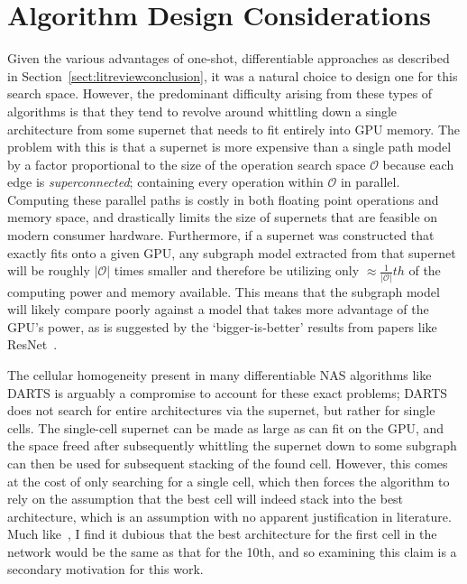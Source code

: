 \section{Algorithm Design Considerations} \label{sect:alg design considerations}
Given the various advantages of one-shot, differentiable approaches as described in Section~\ref{sect:litreviewconclusion}, it was a natural choice to design one for this search space.
However, the predominant difficulty arising from these types of algorithms is that they tend to revolve around whittling down
a single architecture from some supernet that needs to fit entirely into GPU memory. The problem
with this is that a supernet is more expensive than a single path model by a factor proportional to the size of the
operation search space $\mathcal{O}$ because each edge is \textit{superconnected}; containing every operation within
$\mathcal{O}$ in parallel. Computing these parallel paths is costly in both floating point operations and memory
space, and drastically limits the size of supernets that are feasible on modern consumer hardware. Furthermore,
if a supernet was constructed that exactly fits onto a given GPU, any subgraph model extracted from that
supernet will be roughly $|\mathcal{O}|$ times smaller and therefore be utilizing only $\approx\frac{1}{|\mathcal{O}|}th$
of the computing power and memory available. This means that the subgraph model
will likely compare poorly against a model that takes more advantage of the GPU's power, as is suggested by the
`bigger-is-better' results from papers like ResNet~\citep{he2015}.

The cellular homogeneity present in many differentiable NAS algorithms like DARTS is arguably a compromise to
account for these exact problems; DARTS does not search for entire architectures via the supernet, but rather for single
cells. The single-cell supernet can be made as large as can fit on the GPU, and the space freed after subsequently whittling
the supernet down to some subgraph can then be used for subsequent stacking of the found cell. However, this comes at the
cost of only searching for a single cell, which then forces the algorithm to rely on the assumption that the best cell
will indeed stack into the best architecture, which is an assumption with no apparent justification in literature.
Much like~\cite{cai2018}, I find it dubious that
the best architecture for the first cell in the network would be the same as that for the 10th, and so examining this
claim is a secondary motivation for this work.

